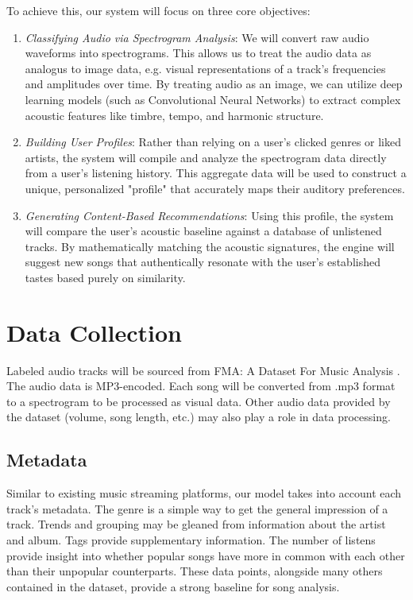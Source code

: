 To achieve this, our system will focus on three core objectives:

\begin{enumerate}
	\item \textit{Classifying Audio via Spectrogram Analysis}: We will convert raw audio waveforms into spectrograms. This allows us to treat the audio data as analogus to image data, e.g. visual representations of a track's frequencies and amplitudes over time. By treating audio as an image, we can utilize deep learning models (such as Convolutional Neural Networks) to extract complex acoustic features like timbre, tempo, and harmonic structure.

	\item \textit{Building User Profiles}: Rather than relying on a user's clicked genres or liked artists, the system will compile and analyze the spectrogram data directly from a user’s listening history. This aggregate data will be used to construct a unique, personalized "profile" that accurately maps their auditory preferences.

	\item \textit{Generating Content-Based Recommendations}: Using this profile, the system will compare the user's acoustic baseline against a database of unlistened tracks. By mathematically matching the acoustic signatures, the engine will suggest new songs that authentically resonate with the user's established tastes based purely on similarity.
\end{enumerate}

\section{Data Collection}
Labeled audio tracks will be sourced from FMA: A Dataset For Music Analysis \cite{defferrard2017}. The audio data is MP3-encoded. Each song will be converted from .mp3 format to a spectrogram to be processed as visual data. Other audio data provided by the dataset (volume, song length, etc.) may also play a role in data processing.

\subsection{Metadata}
Similar to existing music streaming platforms, our model takes into account each track’s metadata. The genre is a simple way to get the general impression of a track. Trends and grouping may be gleaned from information about the artist and album. Tags provide supplementary information. The number of listens provide insight into whether popular songs have more in common with each other than their unpopular counterparts. These data points, alongside many others contained in the dataset, provide a strong baseline for song analysis.

